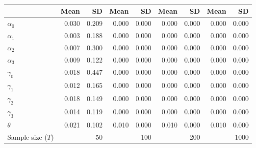 
\begin{tabular}[t]{lrrrrrrrr}
\toprule
  & Mean & SD & Mean  & SD  & Mean   & SD   & Mean    & SD   \\
\midrule
$\alpha_{0}$ & 0.030 & 0.209 & 0.000 & 0.000 & 0.000 & 0.000 & 0.000 & 0.000\\
$\alpha_{1}$ & 0.003 & 0.188 & 0.000 & 0.000 & 0.000 & 0.000 & 0.000 & 0.000\\
$\alpha_{2}$ & 0.007 & 0.300 & 0.000 & 0.000 & 0.000 & 0.000 & 0.000 & 0.000\\
$\alpha_{3}$ & 0.009 & 0.122 & 0.000 & 0.000 & 0.000 & 0.000 & 0.000 & 0.000\\
$\gamma_{0}$ & -0.018 & 0.447 & 0.000 & 0.000 & 0.000 & 0.000 & 0.000 & 0.000\\
$\gamma_{1}$ & 0.012 & 0.165 & 0.000 & 0.000 & 0.000 & 0.000 & 0.000 & 0.000\\
$\gamma_{2}$ & 0.018 & 0.149 & 0.000 & 0.000 & 0.000 & 0.000 & 0.000 & 0.000\\
$\gamma_{3}$ & 0.014 & 0.119 & 0.000 & 0.000 & 0.000 & 0.000 & 0.000 & 0.000\\
$\theta$ & 0.021 & 0.102 & 0.010 & 0.000 & 0.010 & 0.000 & 0.010 & 0.000\\
Sample size ($T$) &  & 50 &  & 100 &  & 200 &  & 1000\\
\bottomrule
\end{tabular}
